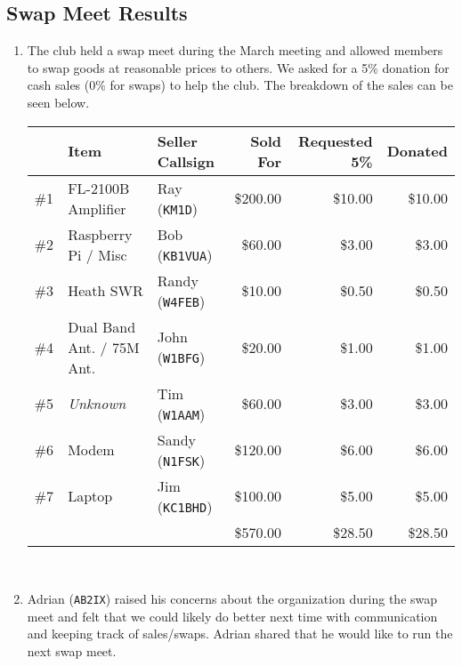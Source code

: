 \documentclass[10pt,letterpaper]{article}
\begin{document}
\subsection{Swap Meet Results}
\begin{enumerate}
\item The club held a swap meet during the March meeting and allowed members to swap goods at reasonable prices to others. We asked for a 5\% donation for cash sales (0\% for swaps) to help the club. The breakdown of the sales can be seen below.\\

\noindent
\begin{tabular}{|lllrr|r|}
\hline
    & \textbf{Item}             & \textbf{Seller Callsign} & \textbf{Sold For} & \textbf{Requested 5\%} & \textbf{Donated} \\ \hline \hline
\#1 & FL-2100B Amplifier        & Ray (\texttt{KM1D})      & \$200.00          & \$10.00                & \$10.00          \\ \hline
\#2 & Raspberry Pi / Misc       & Bob (\texttt{KB1VUA})    & \$60.00           & \$3.00                 & \$3.00           \\ \hline
\#3 & Heath SWR                 & Randy (\texttt{W4FEB})   & \$10.00           & \$0.50                 & \$0.50           \\ \hline
\#4 & Dual Band Ant. / 75M Ant. & John (\texttt{W1BFG})    & \$20.00           & \$1.00                 & \$1.00           \\ \hline
\#5 & \emph{Unknown}            & Tim (\texttt{W1AAM})     & \$60.00           & \$3.00                 & \$3.00           \\ \hline
\#6 & Modem                     & Sandy (\texttt{N1FSK})   & \$120.00          & \$6.00                 & \$6.00           \\ \hline
\#7 & Laptop                    & Jim (\texttt{KC1BHD})    & \$100.00          & \$5.00                 & \$5.00           \\ \hline \hline
    &                           &                          & \$570.00          & \$28.50                & \$28.50          \\ \hline
\end{tabular}\\

\item Adrian (\texttt{AB2IX}) raised his concerns about the organization during the swap meet and felt that we could likely do better next time with communication and keeping track of sales/swaps. Adrian shared that he would like to run the next swap meet.


\end{enumerate}
\end{document}
